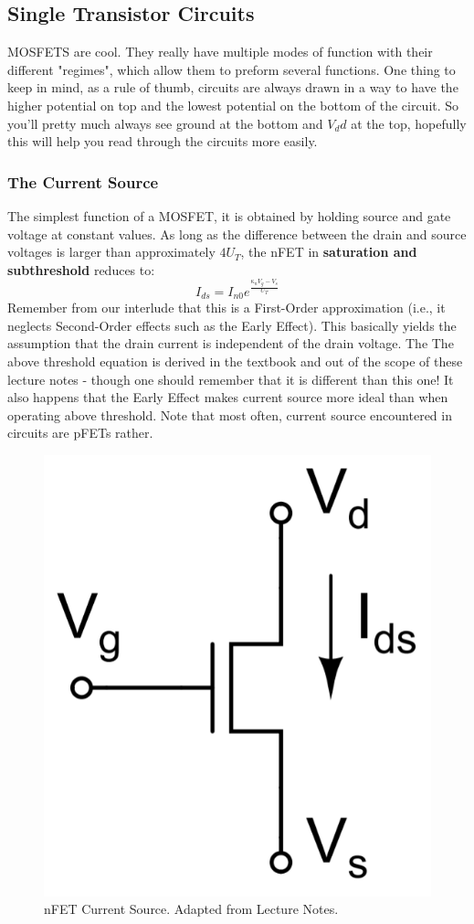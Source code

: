 \subsection{Single Transistor Circuits}
MOSFETS are cool. They really have multiple modes of function with their different "regimes", which allow them to preform several functions. One thing to keep in mind, as a rule of thumb, circuits are always drawn in a way to have the higher potential on top and the lowest potential on the bottom of the circuit. So you'll pretty much always see ground at the bottom and $V_dd$ at the top, hopefully this will help you read through the circuits more easily. 
\subsubsection{The Current Source}
The simplest function of a MOSFET, it is obtained by holding source and gate voltage at constant values. As long as the difference between the drain and source voltages is larger than approximately $4U_T$, the nFET in \textbf{saturation and subthreshold} reduces to:
\begin{equation}
    I_{ds} =  I_{n0} e^{\frac{\kappa_{n}V_g - V_s}{U_T}}
\end{equation}
Remember from our interlude that this is a First-Order approximation (i.e., it neglects Second-Order effects such as the Early Effect). This basically yields the assumption that the drain current is independent of the drain voltage. The The above threshold equation is derived in the textbook and out of the scope of these lecture notes - though one should remember that it is different than this one! It also happens that the Early Effect makes current source more ideal than when operating above threshold. 
Note that most often, current source encountered in circuits are pFETs rather.

\begin{figure}[H]
    \centering
    \includegraphics[width=0.25\linewidth]{../../Figures/N_FET_Current_Source.PNG}
    \caption{nFET Current Source. Adapted from Lecture Notes.}
    \label{fig:basalandcerebellum}
\end{figure}

